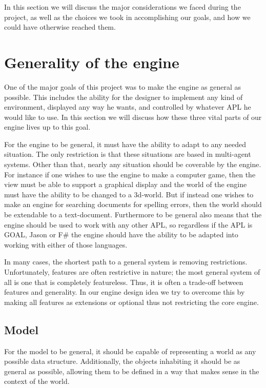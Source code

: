 In this section we will discuss the major considerations we faced
during the project, as well as the choices we took in accomplishing
our goals, and how we could have otherwise reached them.


\section{Generality of the engine\label{sec:DiscussionGenerality}}

One of the major goals of this project was to make the engine as general
as possible. This includes the ability for the designer to implement
any kind of environment, displayed any way he wants, and controlled
by whatever APL he would like to use. In this section we will discuss
how these three vital parts of our engine lives up to this goal.

For the engine to be general, it must have the ability to adapt to
any needed situation. The only restriction is that these situations
are based in multi-agent systems. Other than that, nearly any situation
should be coverable by the engine. For instance if one wishes to use
the engine to make a computer game, then the view must be able to
support a graphical display and the world of the engine must have
the ability to be changed to a 3d-world. But if instead one wishes
to make an engine for searching documents for spelling errors, then
the world should be extendable to a text-document. Furthermore to
be general also means that the engine should be used to work with
any other APL, so regardless if the APL is GOAL, Jason or F\# the
engine should have the ability to be adapted into working with either
of those languages.

In many cases, the shortest path to a general system is removing restrictions.
Unfortunately, features are often restrictive in nature; the most
general system of all is one that is completely featureless. Thus,
it is often a trade-off between features and generality. In our engine
design idea we try to overcome this by making all features as extensions
or optional thus not restricting the core engine.


\subsection*{Model}

For the model to be general, it should be capable of representing
a world as any possible data structure. Additionally, the objects
inhabiting it should be as general as possible, allowing them to be
defined in a way that makes sense in the context of the world. 

